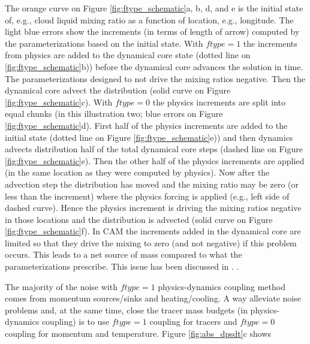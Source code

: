 \documentclass{agujournal}
\begin{document}
The orange curve on Figure \ref{fig:ftype_schematic}a, b, d, and e is the initial state of, e.g., cloud liquid mixing ratio as a function of location, e.g., longitude. The light blue errors show the increments (in terms of length of arrow) computed by the parameterizations based on the initial state. With $ftype=1$ the increments from physics are added to the dynamical core state (dotted line on \ref{fig:ftype_schematic}b)) before the dynamical core advances the solution in time. The parameterizations designed to not drive the mixing ratios negative. Then the dynamical core advect the distribution (solid curve on Figure \ref{fig:ftype_schematic}c). With $ftype=0$ the physics increments are split into equal chunks (in this illustration two; blue errors on Figure \ref{fig:ftype_schematic}d). First half of the physics increments are added to the initial state (dotted line on Figure \ref{fig:ftype_schematic}e)) and then dynamics advects distribution half of the total dynamical core steps (dashed line on Figure \ref{fig:ftype_schematic}e). Then the other half of the physics increments are applied (in the same location as they were computed by physics). Now after the advection step the distribution has moved and the mixing ratio may be zero (or less than the increment) where the physics forcing is applied (e.g., left side of dashed curve). Hence the physics increment is driving the mixing ratios negative in those locations and the distribution is advected (solid curve on Figure \ref{fig:ftype_schematic}f). In CAM the increments added in the dynamical core are limited so that they drive the mixing to zero (and not negative) if this problem occurs. This leads to a net source of mass compared to what the parameterizations prescribe. This issue has been discussed in \cite{water-leak}. {\color{red}{show figs of conservation issue}}. 

The majority of the noise with $ftype=1$ physics-dynamics coupling method comes from momentum sources/sinks and heating/cooling. A way alleviate noise problems and, at the same time, close the tracer mass budgets (in physics-dynamics coupling) is to use $ftype=1$ coupling for tracers and $ftype=0$ coupling for momentum and temperature. Figure \ref{fig:abs_dpsdt}c shows 
\end{document}
